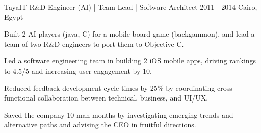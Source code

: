 \begin{cventries}
  \cventry
    {TayaIT} %
    {R\&D Engineer (AI) | Team Lead | Software Architect} %
    {2011 - 2014} %
    {Cairo, Egypt} %
    {
      \begin{cvitems} %
      	\item {Built 2 AI players (java, C) for a mobile board game (backgammon), and lead a team of two R\&D engineers to port them to Objective-C.}
		\item {Led a software engineering team in building 2 iOS mobile apps, driving rankings to 4.5/5 and increasing user engagement by 10.}
		\item {Reduced feedback-development cycle times by 25\% by coordinating cross-functional collaboration between technical, business, and UI/UX.}
		\item {Saved the company 10-man months by investigating emerging trends and alternative paths and advising the CEO in fruitful directions.}
      \end{cvitems}
    }





\end{cventries}

\vspace{-0.5ex}

